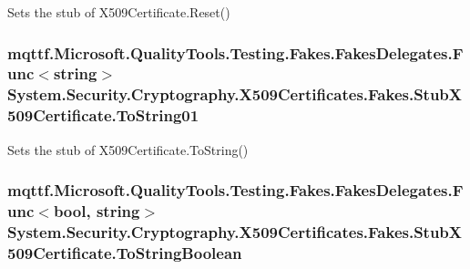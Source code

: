 Sets the stub of X509\-Certificate.\-Reset()

\hypertarget{class_system_1_1_security_1_1_cryptography_1_1_x509_certificates_1_1_fakes_1_1_stub_x509_certificate_aba8fd1e59eac58525eb9b65e6a903a59}{
\subsubsection[{To\-String01}]{\setlength{\rightskip}{0pt plus 5cm}mqttf.\-Microsoft.\-Quality\-Tools.\-Testing.\-Fakes.\-Fakes\-Delegates.\-Func$<$string$>$ System.\-Security.\-Cryptography.\-X509\-Certificates.\-Fakes.\-Stub\-X509\-Certificate.\-To\-String01}}\label{class_system_1_1_security_1_1_cryptography_1_1_x509_certificates_1_1_fakes_1_1_stub_x509_certificate_aba8fd1e59eac58525eb9b65e6a903a59}


Sets the stub of X509\-Certificate.\-To\-String()

\hypertarget{class_system_1_1_security_1_1_cryptography_1_1_x509_certificates_1_1_fakes_1_1_stub_x509_certificate_a408d5fa0f869f9dcb079f0c65b21f4d6}{
\subsubsection[{To\-String\-Boolean}]{\setlength{\rightskip}{0pt plus 5cm}mqttf.\-Microsoft.\-Quality\-Tools.\-Testing.\-Fakes.\-Fakes\-Delegates.\-Func$<$bool, string$>$ System.\-Security.\-Cryptography.\-X509\-Certificates.\-Fakes.\-Stub\-X509\-Certificate.\-To\-String\-Boolean}}\label{class_system_1_1_security_1_1_cryptography_1_1_x509_certificates_1_1_fakes_1_1_stub_x509_certificate_a408d5fa0f869f9dcb079f0c65b21f4d6}


